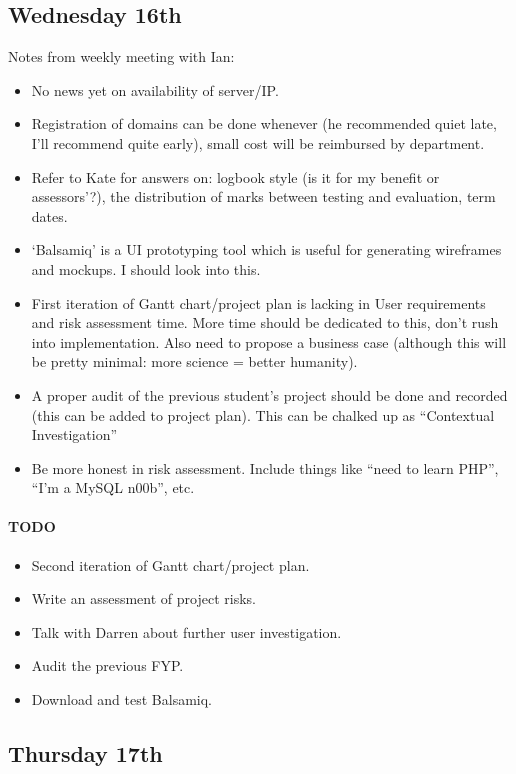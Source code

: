 \subsection{Wednesday 16th}
Notes from weekly meeting with Ian:

\begin{itemize}
\item No news yet on availability of server/IP.
\item Registration of domains can be done whenever (he recommended quiet late,
  I'll recommend quite early), small cost will be reimbursed by department.
\item Refer to Kate for answers on: logbook style (is it for my benefit or
  assessors'?), the distribution of marks between testing and evaluation, term
  dates.
\item `Balsamiq' is a UI prototyping tool which is useful for generating
  wireframes and mockups. I should look into this.
\item First iteration of Gantt chart/project plan is lacking in User
  requirements and risk assessment time. More time should be dedicated to this,
  don't rush into implementation. Also need to propose a business case (although
  this will be pretty minimal: more science = better humanity).
\item A proper audit of the previous student's project should be done and
  recorded (this can be added to project plan). This can be chalked up as
  ``Contextual Investigation''
\item Be more honest in risk assessment. Include things like ``need to learn
  PHP'', ``I'm a MySQL n00b'', etc.
\end{itemize}

\paragraph{TODO}
\begin{itemize}
\item Second iteration of Gantt chart/project plan.
\item Write an assessment of project risks.
\item Talk with Darren about further user investigation.
\item Audit the previous FYP.
\item Download and test Balsamiq.
\end{itemize}

\subsection{Thursday 17th}
